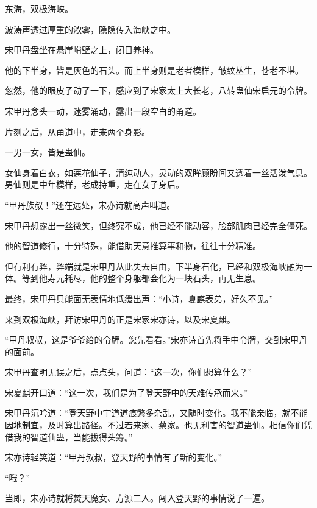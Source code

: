 
\begin{this_body}



东海，双极海峡。

波涛声透过厚重的浓雾，隐隐传入海峡之中。

宋甲丹盘坐在悬崖峭壁之上，闭目养神。

他的下半身，皆是灰色的石头。而上半身则是老者模样，皱纹丛生，苍老不堪。

忽然，他的眼皮子动了一下，感应到了宋家太上大长老，八转蛊仙宋启元的令牌。

宋甲丹念头一动，迷雾涌动，露出一段空白的甬道。

片刻之后，从甬道中，走来两个身影。

一男一女，皆是蛊仙。

女仙身着白衣，如莲花仙子，清纯动人，灵动的双眸顾盼间又透着一丝活泼气息。男仙则是中年模样，老成持重，走在女子身后。

“甲丹族叔！”还在远处，宋亦诗就高声叫道。

宋甲丹想露出一丝微笑，但终究不成，他已经不能动容，脸部肌肉已经完全僵死。

他的智道修行，十分特殊，能借助天意推算事和物，往往十分精准。

但有利有弊，弊端就是宋甲丹从此失去自由，下半身石化，已经和双极海峡融为一体。等到他寿元耗尽，他的整个身躯都会化为一块石头，再无生息。

最终，宋甲丹只能面无表情地低缓出声：“小诗，夏麒表弟，好久不见。”

来到双极海峡，拜访宋甲丹的正是宋家宋亦诗，以及宋夏麒。

“甲丹叔叔，这是爷爷给的令牌。您先看看。”宋亦诗首先将手中令牌，交到宋甲丹的面前。

宋甲丹查明无误之后，点点头，问道：“这一次，你们想算什么？”

宋夏麒开口道：“这一次，我们是为了登天野中的天难传承而来。”

宋甲丹沉吟道：“登天野中宇道道痕繁多杂乱，又随时变化。我不能亲临，就不能因地制宜，及时算出路径。不过若来家、蔡家。也无利害的智道蛊仙。相信你们凭借我的智道仙蛊，当能拔得头筹。”

宋亦诗轻笑道：“甲丹叔叔，登天野的事情有了新的变化。”

“哦？”

当即，宋亦诗就将焚天魔女、方源二人。闯入登天野的事情说了一遍。


\end{this_body}
